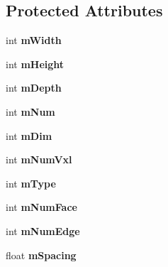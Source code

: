 \subsection*{Protected Attributes}
\begin{DoxyCompactItemize}
\item 
\hypertarget{classvsr_1_1_lattice_ad56fcf210ec88114c757480bcb7a786e}{int {\bfseries m\-Width}}\label{classvsr_1_1_lattice_ad56fcf210ec88114c757480bcb7a786e}

\item 
\hypertarget{classvsr_1_1_lattice_a97f28519e9007779f6a07254f164c2b0}{int {\bfseries m\-Height}}\label{classvsr_1_1_lattice_a97f28519e9007779f6a07254f164c2b0}

\item 
\hypertarget{classvsr_1_1_lattice_a71b5efe06a19c3e627b0721bef48312f}{int {\bfseries m\-Depth}}\label{classvsr_1_1_lattice_a71b5efe06a19c3e627b0721bef48312f}

\item 
\hypertarget{classvsr_1_1_lattice_ad81aa9899a30b8a9b6d391fd5f402dcd}{int {\bfseries m\-Num}}\label{classvsr_1_1_lattice_ad81aa9899a30b8a9b6d391fd5f402dcd}

\item 
\hypertarget{classvsr_1_1_lattice_a981843efe0b4e92bef8f3901cf89f9da}{int {\bfseries m\-Dim}}\label{classvsr_1_1_lattice_a981843efe0b4e92bef8f3901cf89f9da}

\item 
\hypertarget{classvsr_1_1_lattice_aa1d14234889917fac14fa1f3b2771064}{int {\bfseries m\-Num\-Vxl}}\label{classvsr_1_1_lattice_aa1d14234889917fac14fa1f3b2771064}

\item 
\hypertarget{classvsr_1_1_lattice_a988098bf5e25db50a5fbfad07e8f7a4f}{int {\bfseries m\-Type}}\label{classvsr_1_1_lattice_a988098bf5e25db50a5fbfad07e8f7a4f}

\item 
\hypertarget{classvsr_1_1_lattice_a8ba9d0b1befb8fddfdf17ce4ef8c3f19}{int {\bfseries m\-Num\-Face}}\label{classvsr_1_1_lattice_a8ba9d0b1befb8fddfdf17ce4ef8c3f19}

\item 
\hypertarget{classvsr_1_1_lattice_a737cfbb36b328f1b31224beca9a42b7a}{int {\bfseries m\-Num\-Edge}}\label{classvsr_1_1_lattice_a737cfbb36b328f1b31224beca9a42b7a}

\item 
\hypertarget{classvsr_1_1_lattice_aaf0ef3b6b40ab80334ad36be04390e34}{float {\bfseries m\-Spacing}}\label{classvsr_1_1_lattice_aaf0ef3b6b40ab80334ad36be04390e34}


\end{DoxyCompactItemize}
